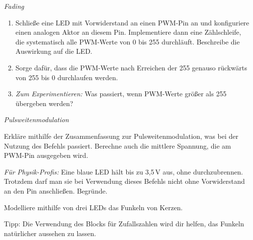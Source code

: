 \bigskip

\begin{aufgabe} \emph{Fading}
	\begin{enumerate}[label=\alph*), itemsep=0ex, parsep=0ex]
		\item Schließe eine LED mit Vorwiderstand an einen PWM-Pin an und konfiguriere einen analogen Aktor an diesem Pin. Implementiere dann eine Zählschleife, die systematisch alle PWM-Werte von 0 bis 255 durchläuft. Beschreibe die Auswirkung auf die LED.
		\item Sorge dafür, dass die PWM-Werte nach Erreichen der 255 genauso rückwärts von 255 bis 0 durchlaufen werden.
		\item \emph{Zum Experimentieren:} Was passiert, wenn PWM-Werte größer als 255 übergeben werden?
	\end{enumerate}
\end{aufgabe}

\bigskip
\begin{aufgabe} \emph{Pulsweitenmodulation}
	
	Erkläre mithilfe der Zusammenfassung zur Pulsweitenmodulation, was bei der Nutzung des Befehls  passiert. Berechne auch die mittlere Spannung, die am PWM-Pin ausgegeben wird.
	
	\emph{Für Physik-Profis:} Eine blaue LED hält bis zu 3,5\,V aus, ohne durchzubrennen. Trotzdem darf man sie bei Verwendung dieses Befehls nicht ohne Vorwiderstand an den Pin anschließen. Begründe.
\end{aufgabe}

\bigskip
\begin{projekt}[Kerzenfunkeln]\label{proj:kerzen}
	Modelliere mithilfe von drei LEDs das Funkeln von Kerzen.
	
	Tipp: Die Verwendung des Blocks für Zufallszahlen wird dir helfen, das Funkeln natürlicher aussehen zu lassen.
\end{projekt}

\vfill
\newpage

